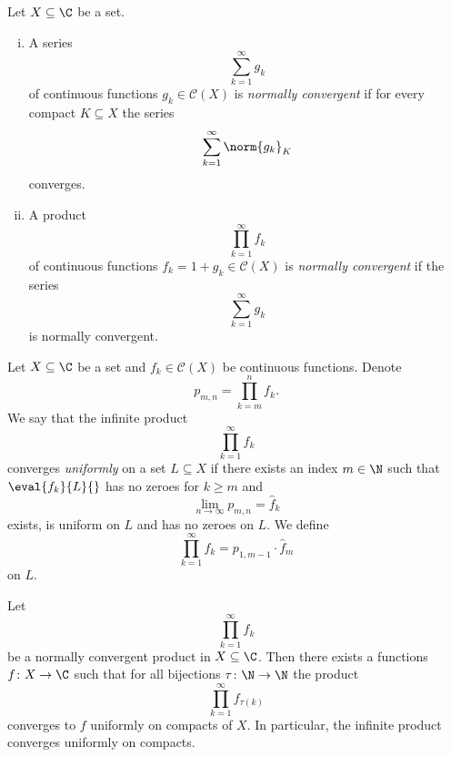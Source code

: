 \begin{definicija}
Let $X \subseteq \C$ be a set.

\begin{enumerate}[i)]
\item A series
\[
\sum_{k=1}^\infty g_k
\]
of continuous functions $g_k \in \mathcal{C}(X)$ is
\emph{normally convergent} if for every
compact $K \subseteq X$ the series
\[
\sum_{k=1}^\infty \norm{g_k}_K
\]
converges.

\item A product
\[
\prod_{k=1}^\infty f_k
\]
of continuous functions $f_k = 1 + g_k \in \mathcal{C}(X)$ is
\emph{normally convergent} if the series
\[
\sum_{k=1}^\infty g_k
\]
is normally convergent.
\end{enumerate}
\end{definicija}

\begin{definicija}
Let $X \subseteq \C$ be a set and $f_k \in \mathcal{C}(X)$ be
continuous functions. Denote
\[
p_{m,n} = \prod_{k=m}^n f_k.
\]
We say that the infinite product
\[
\prod_{k=1}^\infty f_k
\]
converges \emph{uniformly} on a set
$L \subseteq X$ if there exists an index $m \in \N$ such that
$\eval{f_k}{L}{}$ has no zeroes for $k \geq m$ and
\[
\lim_{n \to \infty} p_{m,n} = \widehat{f}_k
\]
exists, is uniform on $L$ and has no zeroes on $L$. We define
\[
\prod_{k=1}^\infty f_k = p_{1, m-1} \cdot \widehat{f}_m
\]
on $L$.
\end{definicija}

\begin{izrek}
Let
\[
\prod_{k=1}^\infty f_k
\]
be a normally convergent product in $X \subseteq \C$. Then there
exists a functions $f \colon X \to \C$ such that for all bijections
$\tau \colon \N \to \N$ the product
\[
\prod_{k=1}^\infty f_{\tau(k)}
\]
converges to $f$ uniformly on compacts of $X$. In particular, the
infinite product converges uniformly on compacts.
\end{izrek}

